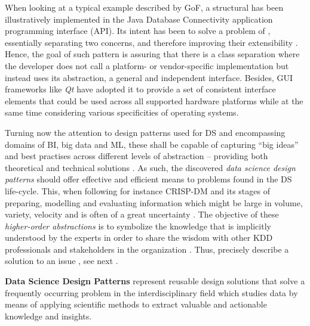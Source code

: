 When looking at a typical example described by \ac{GoF}, a structural  has been illustratively implemented in the Java Database Connectivity application programming interface (\ac{API}).
Its intent has been to solve a problem of , essentially separating two concerns, and therefore improving their extensibility \parencite[171]{GoF2002}.
Hence, the goal of such pattern is assuring that there is a class separation where the developer does not call a platform- or vendor-specific implementation but instead uses its abstraction, a general and independent interface.
Besides, \ac{GUI} frameworks like \emph{Qt} have adopted it to provide a set of consistent interface elements that could be used across all supported hardware platforms while at the same time considering various specificities of operating systems. 

Turning now the attention to design patterns used for \ac{DS} and encompassing domains of \ac{BI}, big data and \ac{ML}, these shall be capable of capturing \enquote{big ideas} and best practises across different levels of abstraction -- providing both theoretical and technical solutions \parencites{MosaicDataScience2017}{Chetan2016}{DeardenHCI2006}{DelibasicBKirchnerK2008AApproach}. 
As such, the discovered \emph{data science design patterns} should offer effective and efficient means to problems found in the \ac{DS} life-cycle. 
This, when following for instance \ac{CRISP-DM} and its stages of preparing, modelling and evaluating information which might be large in volume, variety, velocity and is often of a great uncertainty \parencite{Hossam2017}.
The objective of these \emph{higher-order abstractions} is to symbolize the knowledge that is implicitly understood by the experts in order to share the wisdom with other \ac{KDD} professionals and stakeholders in the organization \parencite{HeffreMheer2006}.
Thus, precisely describe a solution to an issue , see next \parencite[93]{Spinellis1999}. 

\begin{displayquote}
\textbf{Data Science Design Patterns} represent reusable design solutions that solve a frequently occurring problem in the interdisciplinary field which studies data by means of applying scientific methods to extract valuable and actionable knowledge and insights.
\end{displayquote} 

